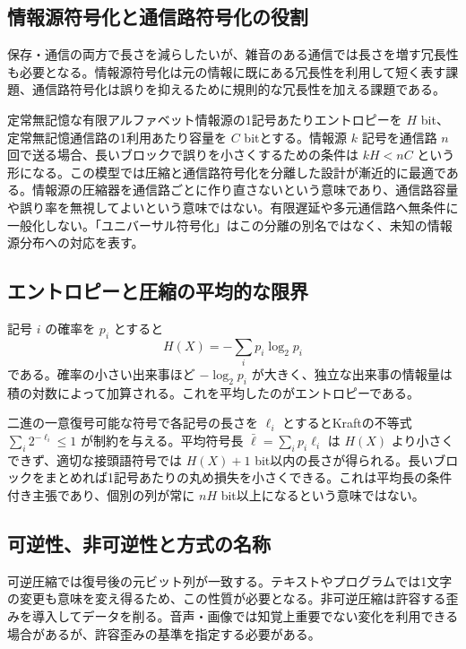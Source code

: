 \subsection{情報源符号化と通信路符号化の役割}
\label{theory:information:separation}
保存・通信の両方で長さを減らしたいが、雑音のある通信では長さを増す冗長性も必要となる。情報源符号化は元の情報に既にある冗長性を利用して短く表す課題、通信路符号化は誤りを抑えるために規則的な冗長性を加える課題である。

定常無記憶な有限アルファベット情報源の1記号あたりエントロピーを \(H\) bit、定常無記憶通信路の1利用あたり容量を \(C\) bitとする。情報源 \(k\) 記号を通信路 \(n\) 回で送る場合、長いブロックで誤りを小さくするための条件は \(kH<nC\) という形になる。この模型では圧縮と通信路符号化を分離した設計が漸近的に最適である\cite{info_separation}。情報源の圧縮器を通信路ごとに作り直さないという意味であり、通信路容量や誤り率を無視してよいという意味ではない。有限遅延や多元通信路へ無条件に一般化しない。「ユニバーサル符号化」はこの分離の別名ではなく、未知の情報源分布への対応を表す。

\subsection{エントロピーと圧縮の平均的な限界}
\label{theory:information:entropy}
記号 \(i\) の確率を \(p_i\) とすると
\[
 H(X)=-\sum_i p_i\log_2p_i
\]
である。確率の小さい出来事ほど \(-\log_2p_i\) が大きく、独立な出来事の情報量は積の対数によって加算される。これを平均したのがエントロピーである。

二進の一意復号可能な符号で各記号の長さを \(\ell_i\) とするとKraftの不等式 \(\sum_i2^{-\ell_i}\le1\) が制約を与える。平均符号長 \(\bar\ell=\sum_ip_i\ell_i\) は \(H(X)\) より小さくできず、適切な接頭語符号では \(H(X)+1\) bit以内の長さが得られる\cite{info_lossless}。長いブロックをまとめれば1記号あたりの丸め損失を小さくできる。これは平均長の条件付き主張であり、個別の列が常に \(nH\) bit以上になるという意味ではない。

\subsection{可逆性、非可逆性と方式の名称}
\label{theory:information:compression}
可逆圧縮では復号後の元ビット列が一致する。テキストやプログラムでは1文字の変更も意味を変え得るため、この性質が必要となる。非可逆圧縮は許容する歪みを導入してデータを削る。音声・画像では知覚上重要でない変化を利用できる場合があるが、許容歪みの基準を指定する必要がある。

